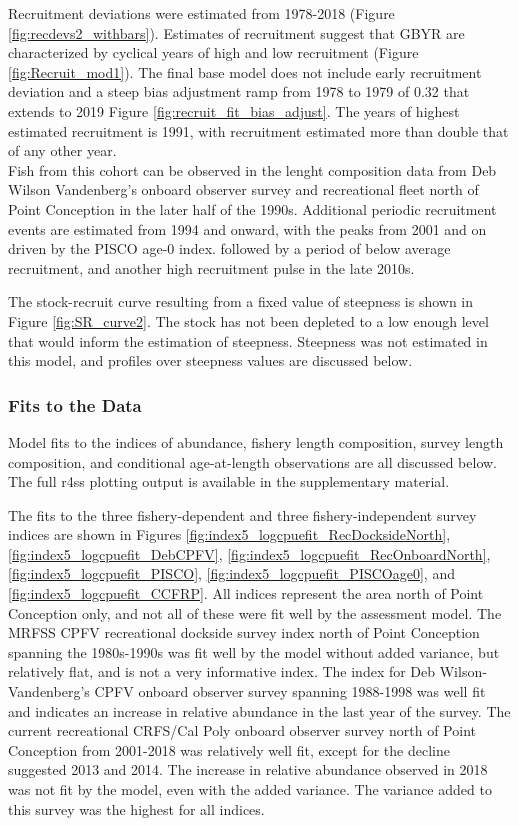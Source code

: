 \documentclass[12pt,]{article}
\begin{document}
Recruitment deviations were estimated from 1978-2018 (Figure
\ref{fig:recdevs2_withbars}). Estimates of recruitment suggest that GBYR
are characterized by cyclical years of high and low recruitment (Figure
\ref{fig:Recruit_mod1}). The final base model does not include early
recruitment deviation and a steep bias adjustment ramp from 1978 to 1979
of 0.32 that extends to 2019 Figure \ref{fig:recruit_fit_bias_adjust}.
The years of highest estimated recruitment is 1991, with recruitment
estimated more than double that of any other year.\\
Fish from this cohort can be observed in the lenght composition data
from Deb Wilson Vandenberg's onboard observer survey and recreational
fleet north of Point Conception in the later half of the 1990s.
Additional periodic recruitment events are estimated from 1994 and
onward, with the peaks from 2001 and on driven by the PISCO age-0 index.
followed by a period of below average recruitment, and another high
recruitment pulse in the late 2010s.

The stock-recruit curve resulting from a fixed value of steepness is
shown in Figure \ref{fig:SR_curve2}. The stock has not been depleted to
a low enough level that would inform the estimation of steepness.
Steepness was not estimated in this model, and profiles over steepness
values are discussed below.

\subsubsection{Fits to the Data}\label{fits-to-the-data}

Model fits to the indices of abundance, fishery length composition,
survey length composition, and conditional age-at-length observations
are all discussed below. The full r4ss plotting output is available in
the supplementary material.

The fits to the three fishery-dependent and three fishery-independent
survey indices are shown in Figures
\ref{fig:index5_logcpuefit_RecDocksideNorth},
\ref{fig:index5_logcpuefit_DebCPFV},
\ref{fig:index5_logcpuefit_RecOnboardNorth},
\ref{fig:index5_logcpuefit_PISCO},
\ref{fig:index5_logcpuefit_PISCOage0}, and
\ref{fig:index5_logcpuefit_CCFRP}. All indices represent the area north
of Point Conception only, and not all of these were fit well by the
assessment model. The MRFSS CPFV recreational dockside survey index
north of Point Conception spanning the 1980s-1990s was fit well by the
model without added variance, but relatively flat, and is not a very
informative index. The index for Deb Wilson-Vandenberg's CPFV onboard
observer survey spanning 1988-1998 was well fit and indicates an
increase in relative abundance in the last year of the survey. The
current recreational CRFS/Cal Poly onboard observer survey north of
Point Conception from 2001-2018 was relatively well fit, except for the
decline suggested 2013 and 2014. The increase in relative abundance
observed in 2018 was not fit by the model, even with the added variance.
The variance added to this survey was the highest for all indices.
\end{document}
